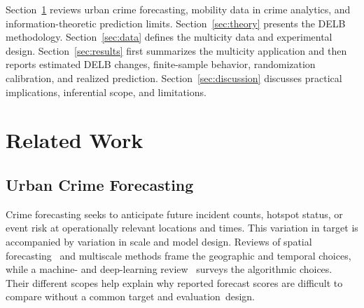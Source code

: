 \documentclass[applsci,article,accept,moreauthors]{Definitions/mdpi}
\begin{document}
Section~\ref{sec:related_work} reviews urban crime forecasting, mobility data
in crime analytics, and information-theoretic prediction limits.
\mbox{Section~\ref{sec:theory}} presents the DELB methodology. \mbox{Section~\ref{sec:data}}
defines the multicity data and experimental design. Section~\ref{sec:results}
first summarizes the multicity application and then reports estimated DELB
changes, finite-sample behavior, randomization calibration, and realized
prediction.
Section~\ref{sec:discussion} discusses practical implications, inferential
scope, and limitations.


\section{Related Work}
\label{sec:related_work}

\subsection{Urban Crime Forecasting}
\label{subsec:related_crime_forecasting}

Crime forecasting seeks to anticipate future incident counts, hotspot status,
or event risk at operationally relevant locations and times. {This variation
in target is accompanied by variation in scale and model design. Reviews of
spatial forecasting~\citep{kounadi2020review} and multiscale methods
\citep{du2023review} frame the geographic and temporal choices, while a
machine- and deep-learning review~\citep{mandalapu2023review} surveys the
algorithmic choices. Their different scopes help explain why reported
forecast scores are difficult to compare without a common target and
evaluation~design.}
\end{document}
